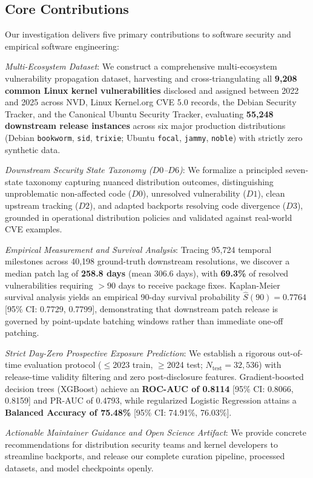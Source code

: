 \documentclass[final,5p,times,twocolumn]{elsarticle}
\begin{document}
\subsection{Core Contributions}
Our investigation delivers five primary contributions to software security and empirical software engineering:

\textit{Multi-Ecosystem Dataset}: We construct a comprehensive multi-ecosystem vulnerability propagation dataset, harvesting and cross-triangulating all \textbf{9,208 common Linux kernel vulnerabilities} disclosed and assigned between 2022 and 2025 across NVD, Linux Kernel.org CVE 5.0 records, the Debian Security Tracker, and the Canonical Ubuntu Security Tracker, evaluating \textbf{55,248 downstream release instances} across six major production distributions (Debian \texttt{bookworm}, \texttt{sid}, \texttt{trixie}; Ubuntu \texttt{focal}, \texttt{jammy}, \texttt{noble}) with strictly zero synthetic data.

\textit{Downstream Security State Taxonomy ($D0$--$D6$)}: We formalize a principled seven-state taxonomy capturing nuanced distribution outcomes, distinguishing unproblematic non-affected code ($D0$), unresolved vulnerability ($D1$), clean upstream tracking ($D2$), and adapted backports resolving code divergence ($D3$), grounded in operational distribution policies and validated against real-world CVE examples.

\textit{Empirical Measurement and Survival Analysis}: Tracing 95,724 temporal milestones across 40,198 ground-truth downstream resolutions, we discover a median patch lag of \textbf{258.8 days} (mean 306.6 days), with \textbf{69.3\%} of resolved vulnerabilities requiring $>90$ days to receive package fixes. Kaplan-Meier survival analysis yields an empirical 90-day survival probability $\hat{S}(90) = 0.7764$ [95\% CI: 0.7729, 0.7799], demonstrating that downstream patch release is governed by point-update batching windows rather than immediate one-off patching.

\textit{Strict Day-Zero Prospective Exposure Prediction}: We establish a rigorous out-of-time evaluation protocol ($\le$2023 train, $\ge$2024 test; $N_{\text{test}} = 32,536$) with release-time validity filtering and zero post-disclosure features. Gradient-boosted decision trees (XGBoost) achieve an \textbf{ROC-AUC of 0.8114} [95\% CI: 0.8066, 0.8159] and PR-AUC of 0.4793, while regularized Logistic Regression attains a \textbf{Balanced Accuracy of 75.48\%} [95\% CI: 74.91\%, 76.03\%].

\textit{Actionable Maintainer Guidance and Open Science Artifact}: We provide concrete recommendations for distribution security teams and kernel developers to streamline backports, and release our complete curation pipeline, processed datasets, and model checkpoints openly.
\end{document}

